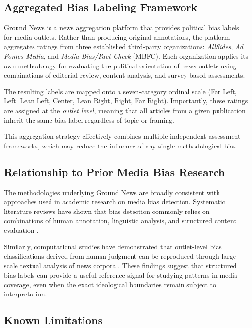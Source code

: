 \documentclass[11pt]{article}
\begin{document}
\subsection{Aggregated Bias Labeling Framework}

Ground News is a news aggregation platform that provides political bias labels
for media outlets. Rather than producing original annotations, the platform
aggregates ratings from three established third-party organizations:
\textit{AllSides}, \textit{Ad Fontes Media}, and \textit{Media Bias/Fact Check}
(MBFC). Each organization applies its own methodology for evaluating the
political orientation of news outlets using combinations of editorial review,
content analysis, and survey-based assessments.

The resulting labels are mapped onto a seven-category ordinal scale
(Far Left, Left, Lean Left, Center, Lean Right, Right, Far Right). Importantly,
these ratings are assigned at the \textit{outlet level}, meaning that all
articles from a given publication inherit the same bias label regardless of
topic or framing.

This aggregation strategy effectively combines multiple independent
assessment frameworks, which may reduce the influence of any single
methodological bias.

\subsection{Relationship to Prior Media Bias Research}

The methodologies underlying Ground News are broadly consistent with
approaches used in academic research on media bias detection.
Systematic literature reviews have shown that bias detection commonly relies
on combinations of human annotation, linguistic analysis, and structured
content evaluation \cite{rodrigo2023systematic,spinde2024media}.

Similarly, computational studies have demonstrated that outlet-level bias
classifications derived from human judgment can be reproduced through
large-scale textual analysis of news corpora \cite{dalonzo2022machine,elejalde2018nature}.
These findings suggest that structured bias labels can provide a useful
reference signal for studying patterns in media coverage, even when the
exact ideological boundaries remain subject to interpretation.

\subsection{Known Limitations}
\end{document}
